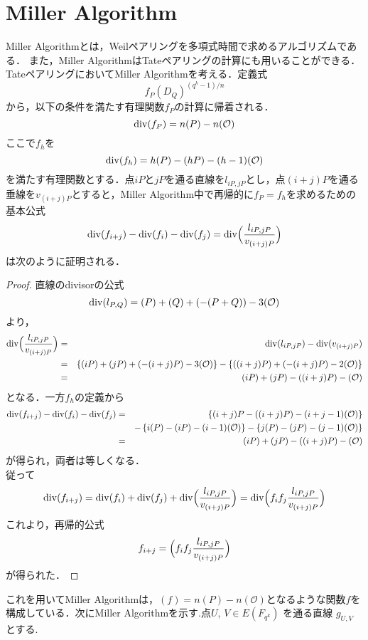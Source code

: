 \section{Miller Algorithm}
\par
Miller Algorithm\cite{MIA}とは，Weilペアリングを多項式時間で求めるアルゴリズムである．
また，Miller AlgorithmはTateペアリングの計算にも用いることができる．TateペアリングにおいてMiller Algorithmを考える．定義式
\[
f_P(D_Q)^{{(q^k-1)}/n}
\]
から，以下の条件を満たす有理関数$f_P$の計算に帰着される．
\[
{\rm div}(f_P)=n(P)-n(\mathcal{O})
\]
ここで$f_h$を
\[
{\rm div}(f_h)=h(P)-(hP)-(h-1)(\mathcal{O})
\]
を満たす有理関数とする．点$iP$と$jP$を通る直線を$l_{iP,jP}$とし，点$(i+j)P$を通る垂線を$v_{(i+j)P}$とすると，Miller Algorithm中で再帰的に$f_P=f_h$を求めるための基本公式
\[
{\rm div}(f_{i+j})-{\rm div}(f_i)-{\rm div}(f_j)={\rm div}\Bigl(\frac{l_{iP,jP}}{v_{(i+j)P}}\Bigr)
\]
は次のように証明される．
\begin{proof}
直線のdivisorの公式
\[
{\rm div}(l_{P,Q})=(P)+(Q)+(-(P+Q))-3(\mathcal{O})
\]
より，
\begin{eqnarray*}
{\rm div}\Bigl(\frac{l_{iP,jP}}{v_{(i+j)P}}\Bigr)&=&{\rm div}(l_{iP,jP})-{\rm div}(v_{(i+j)P})\\
&=&\left\{(iP)+(jP)+(-(i+j)P)-3(\mathcal{O})\right\}-\left\{((i+j)P)+(-(i+j)P)-2(\mathcal{O})\right\}\\
&=&(iP)+(jP)-((i+j)P)-(\mathcal{O})
\end{eqnarray*}となる．一方$f_h$の定義から
\begin{eqnarray*}
{\rm div}(f_{i+j})-{\rm div}(f_i)-{\rm div}(f_j)&=&\left\{(i+j)P-((i+j)P)-(i+j-1)(\mathcal{O})\right\}\\
&\ \ \ &-\left\{i(P)-(iP)-(i-1)(\mathcal{O})\right\}-\left\{j(P)-(jP)-(j-1)(\mathcal{O})\right\}\\
&=&(iP)+(jP)-((i+j)P)-(\mathcal{O})
\end{eqnarray*}が得られ，両者は等しくなる．\\
従って
\[
{\rm div}(f_{i+j})={\rm div}(f_i)+{\rm div}(f_j)+{\rm div}\Bigl(\frac{l_{iP,jP}}{v_{(i+j)P}}\Bigr)={\rm div}\Bigl(f_if_j\frac{l_{iP,jP}}{v_{(i+j)P}}\Bigr)
\]
これより，再帰的公式
\[
f_{i+j}=\Bigl(f_if_j\frac{l_{iP,jP}}{v_{(i+j)P}}\Bigr)
\]が得られた．
\end{proof}
これを用いてMiller Algorithmは，$(f) = n(P) - n(\mathcal{O})$となるような関数$f$を構成している．次にMiller Algorithmを示す.点$U$, $V ∈ E(F_{q^k})$ を通る直線 $g_{U,V}$ とする.\\ 
\par
